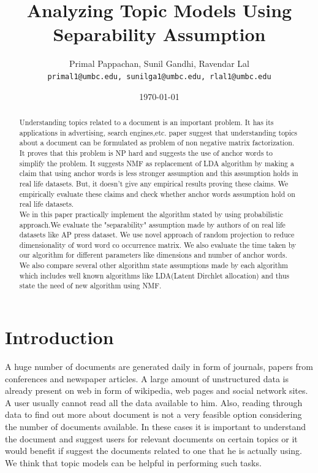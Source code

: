 \documentclass[a4paper,11pt]{article}
\begin{document}

\title{Analyzing Topic Models Using Separability Assumption}
\author{Primal Pappachan, Sunil Gandhi, Ravendar Lal \\ 
\texttt{primal1@umbc.edu, sunilga1@umbc.edu, rlal1@umbc.edu}}
\date{\today}
\maketitle



\begin{abstract}
Understanding topics related to a document is an important problem. It has its applications in advertising, search engines,etc. \cite{tm} paper suggest that understanding topics about a document can be formulated as problem of non negative matrix factorization. It proves that this problem is NP hard and suggests the use of anchor words to simplify the problem. It suggests NMF as replacement of LDA algorithm by making a claim that using anchor words is less stronger assumption and this assumption holds in real life datasets. But, it doesn't give any empirical results proving these claims. We empirically evaluate these claims and check whether anchor words assumption hold on real life datasets. \\

We in this paper practically implement the algorithm stated by \cite{tm} using probabilistic approach.We evaluate the "separability" assumption made by authors of \cite{tm} on real life datasets like AP press dataset. We use novel approach of random projection to reduce dimensionality of word word co occurrence matrix. We also evaluate the time taken by our algorithm for different parameters like dimensions and number of anchor words. We also compare several other algorithm state assumptions made by each algorithm which includes well known algorithms like LDA(Latent Dirchlet allocation) and thus state the need of new algorithm using NMF.
\end{abstract}

\pagebreak

\section{Introduction}
A huge number of documents are generated daily in form of journals, papers from conferences and newspaper articles. A large amount of unstructured data is already present on web in form of wikipedia, web pages and social network sites. A user usually cannot read all the data available to him. Also, reading through data to find out more about document is not a very feasible option considering the number of documents available. In these cases it is important to understand the document and suggest users for relevant documents on certain topics or it would benefit if suggest the documents related to one that he is actually using. We think that topic models can be helpful in performing such tasks. \\
\end{document}
